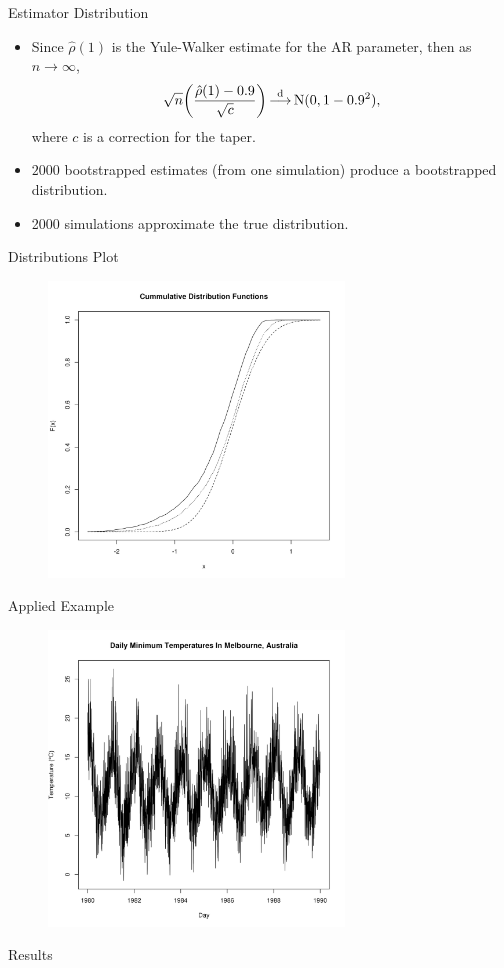 
\begin{frame}{Estimator Distribution}
\begin{itemize}
    \item
    Since $\hat{\rho}(1)$ is the Yule-Walker estimate for the AR parameter,
    then as $n \to \infty$,
        \[
        \sqrt{n} \biggl( \frac{\hat{\rho}(1) - 0.9}{\sqrt{c}} \biggr)
        \mathop{\overset{\mathrm{d}}{\longrightarrow}}
        \operatorname{N}(0, 1 - 0.9^2),
        \]
    where $c$ is a correction for the taper.

    \item
    $2000$ bootstrapped estimates (from one simulation)
    produce a bootstrapped distribution.

    \item
    2000 simulations approximate the true distribution.
\end{itemize}
\end{frame}

\begin{frame}{Distributions Plot}
    \begin{figure}
    \centering
    \includegraphics[width = 0.7\textwidth]{res/ex1_cdf.png}
    \end{figure}
\end{frame}

\begin{frame}{Applied Example}
    \begin{figure}
    \centering
    \includegraphics[width = 0.7\textwidth]{res/exA.png}
    \end{figure}
\end{frame}

\begin{frame}{Results}
\end{frame}

